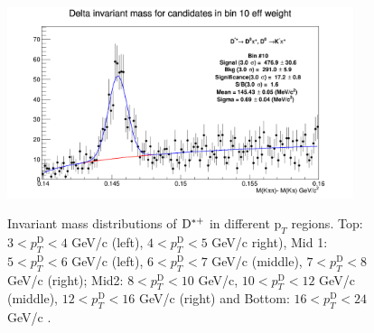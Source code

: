 \begin{figure}[!htp]
{\includegraphics[width=0.6\linewidth, height=5.6cm]{figures/Dstar_wEFF/InvMassDistributions_Dstar_Bins10to10.png}}

\caption{Invariant mass distributions of ${\rm D^{*+}}$ in different $\text{p}_T$ regions. Top: $3< p_{T}^{\text{D}}< 4$ GeV/c (left), $4< p_{T}^{\text{D}}< 5$ GeV/c right), Mid 1: $5< p_{T}^{\text{D}}< 6$ GeV/c (left), $6 < p_{T}^{\text{D}} < 7$ GeV/c (middle), $7< p_{T}^{\text{D}}< 8$ GeV/c (right); Mid2: $8< p_{T}^{\text{D}}< 10$ GeV/c, $10< p_{T}^{\text{D}}< 12$ GeV/c  (middle), $12 < p_{T}^{\text{D}}< 16$ GeV/c  (right) and Bottom: $16<p_{T}^{\text{D}}< 24$ GeV/c .}
\label{fig:InvMassDs}
\end{figure}

